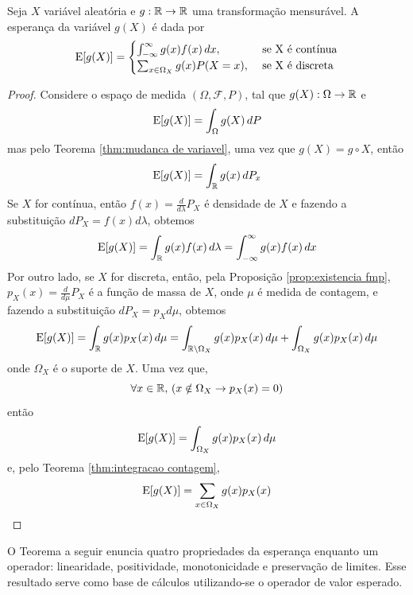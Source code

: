 \begin{thm:esperanca de transformacao}
Seja $X$ variável aleatória e $g: \mathbb{R} \to \mathbb{R}$ uma transformação mensurável.
A esperança da variável $g(X)$ é dada por
\[
	\ev{g(X)} = \begin{cases}
		\int_{-\infty}^\infty g(x) f(x)\, dx, & \text{ se } $X$ \text{ é contínua}  \\
		\sum_{x \in \Omega_X} g(x) P(X = x),  & \text{ se }  $X$ \text{ é discreta} \\
	\end{cases}
\]
\begin{proof}
	Considere o espaço de medida $(\Omega, \mathcal{F}, P)$, tal que
	$g(X): \Omega \to \mathbb{R}$ e
	\[
		\mathrm{E}\!\left[g(X)\right] = \int_\Omega g(X)\, dP
	\]
	mas pelo Teorema \ref{thm:mudanca de variavel}, uma vez que $g(X) = g \circ X$, então
	\[
		\mathrm{E}\!\left[g(X)\right] = \int_{\mathbb{R}} g(x)\, dP_x
	\]
	Se $X$ for contínua, então $f(x) = \frac{d}{d\lambda}P_X$ é densidade de $X$ e fazendo
	a substituição
	$dP_X = f(x) d\lambda$, obtemos
	\[
		\mathrm{E}\!\left[g(X)\right] = \int_{\mathbb{R}} g(x) f(x)\, d\lambda = \int_{-\infty}^\infty g(x)f(x)\, dx
	\]
	Por outro lado, se $X$ for discreta, então, pela Proposição \ref{prop:existencia fmp},
	$p_X(x) = \frac{d}{d\mu}P_X$ é a função de massa de $X$, onde $\mu$ é medida de
	contagem, e fazendo a substituição $dP_X = p_Xd\mu$, obtemos
	\[
    	\mathrm{E}\!\left[g(X)\right] = \int_{\mathbb{R}} g(x) p_X(x)\, d\mu = \int_{\mathbb{R} \setminus \Omega_X} g(x)p_X(x)\, d\mu +
            \int_{\Omega_X} g(x)p_X(x)\, d\mu
	\]
	onde $\Omega_X$ é o suporte de $X$.
	Uma vez que,
	\[
	    \forall x \in \mathbb{R},\, ( x \notin \Omega_X \rightarrow p_X(x) = 0 )
	\]
	então
	\[
    	\mathrm{E}\!\left[g(X)\right] = \int_{\Omega_X} g(x)p_X(x)\, d\mu
	\]
	e, pelo Teorema \ref{thm:integracao contagem},
	\[
    	\mathrm{E}\!\left[g(X)\right] = \sum_{x \in \Omega_X} g(x)p_X(x)
	\]
\end{proof}
\end{thm:esperanca de transformacao}

O Teorema a seguir enuncia quatro propriedades da esperança enquanto um operador:
linearidade, positividade, monotonicidade e preservação de limites.
Esse resultado serve como base de cálculos utilizando-se o operador de valor esperado.

